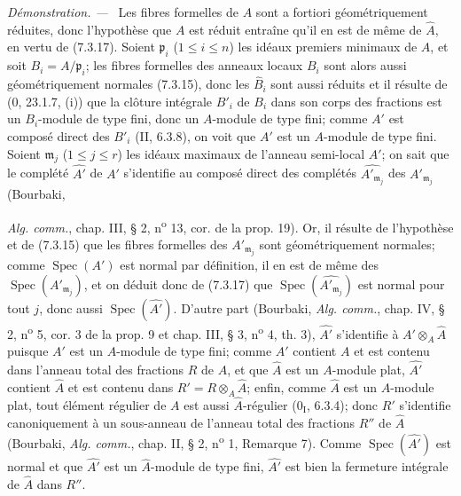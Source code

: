 \documentclass[10pt,oneside]{book}
\newcommand{\oldpage}[2][]{%
  \setcounter{footnote}{0}%
  \marginpar{\scriptsize\textbf{#1}~|~#2}\ignorespaces}
\newenvironment{proof}{%
  \par\medskip\noindent\textit{Démonstration. ---\ }}{\par}
\begin{document}
\begin{proof}
Les fibres formelles de $A$ sont a fortiori géométriquement réduites, donc
l'hypothèse que $A$ est réduit entraîne qu'il en est de même de $\widehat A$,
en vertu de (7.3.17). Soient $\mathfrak p_i$ ($1\leq i\leq n$) les idéaux
premiers minimaux de $A$, et soit $B_i=A/\mathfrak p_i$; les fibres formelles
des anneaux locaux $B_i$ sont alors aussi géométriquement normales (7.3.15),
donc les $\widehat B_i$ sont aussi réduits et il résulte de (0, 23.1.7, (i))
que la clôture intégrale $B'_i$ de $B_i$ dans son corps des fractions est un
$B_i$-module de type fini, donc un $A$-module de type fini; comme $A'$ est
composé direct des $B'_i$ (II, 6.3.8), on voit que $A'$ est un $A$-module de
type fini. Soient $\mathfrak m_j$ ($1\leq j\leq r$) les idéaux maximaux de
l'anneau semi-local $A'$; on sait que le complété $\widehat{A'}$ de $A'$
s'identifie au composé direct des complétés
$\widehat{A'_{\mathfrak m_j}}$ des $A'_{\mathfrak m_j}$ (Bourbaki,

\oldpage[IV-2]{209}

\emph{Alg. comm.}, chap. III, § 2, n\textsuperscript{o} 13, cor. de la prop. 19).
Or, il résulte de l'hypothèse et de (7.3.15) que les fibres formelles des
$A'_{\mathfrak m_j}$ sont géométriquement normales; comme
$\operatorname{Spec}(A')$ est normal par définition, il en est de même des
$\operatorname{Spec}(A'_{\mathfrak m_j})$, et on déduit donc de (7.3.17) que
$\operatorname{Spec}(\widehat{A'_{\mathfrak m_j}})$ est normal pour tout $j$,
donc aussi $\operatorname{Spec}(\widehat{A'})$. D'autre part (Bourbaki,
\emph{Alg. comm.}, chap. IV, § 2, n\textsuperscript{o} 5, cor. 3 de la prop. 9
et chap. III, § 3, n\textsuperscript{o} 4, th. 3), $\widehat{A'}$ s'identifie
à $A'\otimes_A\widehat A$ puisque $A'$ est un $A$-module de type fini; comme
$A'$ contient $A$ et est contenu dans l'anneau total des fractions $R$ de $A$,
et que $\widehat A$ est un $A$-module plat, $\widehat{A'}$ contient
$\widehat A$ et est contenu dans $R'=R\otimes_A\widehat A$; enfin, comme
$\widehat A$ est un $A$-module plat, tout élément régulier de $A$ est aussi
$\widehat A$-régulier (0$_{\mathrm I}$, 6.3.4); donc $R'$ s'identifie
canoniquement à un sous-anneau de l'anneau total des fractions $R''$ de
$\widehat A$ (Bourbaki, \emph{Alg. comm.}, chap. II, § 2,
n\textsuperscript{o} 1, Remarque 7). Comme
$\operatorname{Spec}(\widehat{A'})$ est normal et que $\widehat{A'}$ est un
$\widehat A$-module de type fini, $\widehat{A'}$ est bien la fermeture
intégrale de $\widehat A$ dans $R''$.
\end{proof}
\end{document}
